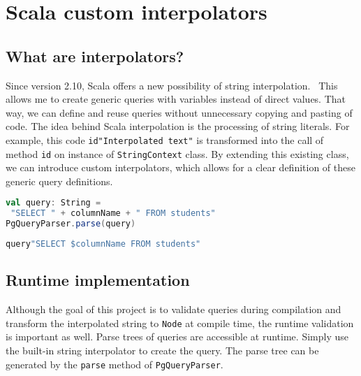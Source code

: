 \section{Scala custom interpolators}
\subsection{What are interpolators?}
Since version 2.10, Scala offers a new possibility of string interpolation.~\cite{String interpolation} This allows me to create generic queries with variables instead of direct values. That way, we can define and reuse queries without unnecessary copying and pasting of code. The idea behind Scala interpolation is the processing of string literals. For example, this code  \verb|id"Interpolated text"| is transformed into the call of method \texttt{id} on instance of \texttt{StringContext} class. By extending this existing class, we can introduce custom interpolators, which allows for a clear definition of these generic query definitions.
\bigskip
\newline
\begin{lstlisting}[language=scala, basicstyle=\ttfamily, showstringspaces=false, caption={Example of \texttt{String} concatenation}]
val query: String = 
 "SELECT " + columnName + " FROM students"
PgQueryParser.parse(query)
\end{lstlisting}
\bigskip
\begin{lstlisting}[language=scala, basicstyle=\ttfamily, showstringspaces=false, caption={Example of \texttt{String} interpolation}]
query"SELECT $columnName FROM students"
\end{lstlisting}

\subsection{Runtime implementation}
Although the goal of this project is to validate queries during compilation and transform the interpolated string to \texttt{Node} at compile time, the runtime validation is important as well. Parse trees of queries are accessible at runtime. Simply use the built-in string interpolator to create the query. The parse tree can be generated by the \texttt{parse} method of \texttt{PgQueryParser}.